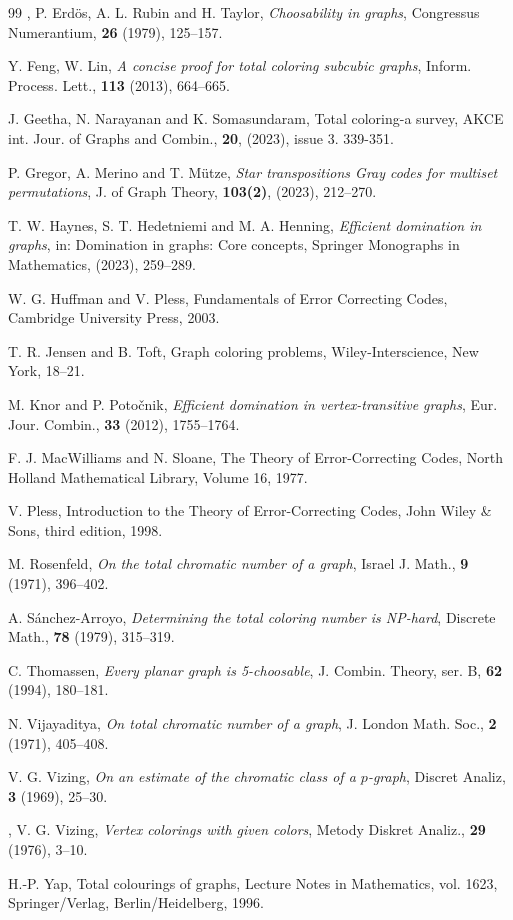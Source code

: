 \documentclass[12pt,reqno]{article}
\begin{document}
\begin{thebibliography}{99}
, P. Erd\"os, A. L. Rubin and H. Taylor, {\it Choosability in graphs}, Congressus Numerantium, {\bf 26} (1979), 125--157.

 Y. Feng, W. Lin, {\it A concise proof for total coloring subcubic graphs}, Inform. Process. Lett., {\bf 113} (2013), 664--665.

 J. Geetha, N. Narayanan and K. Somasundaram, {Total coloring-a survey}, AKCE int. Jour. of Graphs and Combin., {\bf 20}, (2023), issue 3. 339-351. 

 P. Gregor, A. Merino and T. M\"utze, {\it Star transpositions Gray codes for multiset permutations}, J. of Graph Theory, {\bf 103(2)}, (2023), 212--270.

 T. W. Haynes, S. T. Hedetniemi and M. A. Henning, {\it Efficient domination in graphs}, in: Domination in graphs:  Core concepts, Springer Monographs in Mathematics, (2023), 259--289.

 W. G. Huffman and V. Pless, Fundamentals of Error Correcting Codes, Cambridge University Press, 2003.

 T. R. Jensen and B. Toft, Graph coloring problems, Wiley-Interscience, New York, 18--21.

 M. Knor and P. Poto\v{c}nik, {\it Efficient domination in vertex-transitive graphs}, Eur. Jour. Combin., {\bf 33} (2012), 1755--1764.

 F. J. MacWilliams and N. Sloane, The Theory of Error-Correcting Codes, North Holland Mathematical Library, Volume 16, 1977.

 V. Pless, Introduction to the Theory of Error-Correcting Codes, John Wiley \& Sons, third edition, 1998.

 M. Rosenfeld, {\it On the total chromatic number of a graph}, Israel J. Math., {\bf 9} (1971), 396--402.

 A. S\'anchez-Arroyo, {\it Determining the total coloring number is NP-hard}, Discrete Math., {\bf 78} (1979), 315--319.

 C. Thomassen, {\it Every planar graph is 5-choosable}, J. Combin. Theory, ser. B, {\bf 62} (1994), 180--181.

 N. Vijayaditya, {\it On total chromatic number of a graph}, J. London Math. Soc., {\bf 2} (1971), 405--408.

 V. G. Vizing, {\it On an estimate of the chromatic class of a $p$-graph}, Discret Analiz, {\bf 3} (1969), 25--30.

, V. G. Vizing, {\it Vertex colorings with given colors}, Metody Diskret Analiz., {\bf 29} (1976), 3--10.

 H.-P. Yap, Total colourings of graphs, Lecture Notes in Mathematics, vol. 1623, Springer/Verlag, Berlin/Heidelberg, 1996.

\end{thebibliography}
\end{document}
